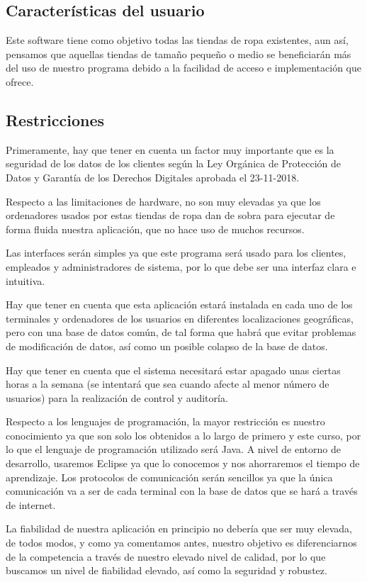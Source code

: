 \subsection{Características del usuario}
Este software tiene como objetivo todas las tiendas de ropa existentes, aun así, pensamos
que aquellas tiendas de tamaño pequeño o medio se beneficiarán más del uso de
nuestro programa debido a la facilidad de acceso e implementación que ofrece.
\subsection{Restricciones}
Primeramente, hay que tener en cuenta un factor muy importante que es la seguridad
de los datos de los clientes según la Ley Orgánica de Protección de Datos y Garantía de
los Derechos Digitales aprobada el 23-11-2018.

Respecto a las limitaciones de hardware, no son muy elevadas ya que los ordenadores
usados por estas tiendas de ropa dan de sobra para ejecutar de forma fluida nuestra
aplicación, que no hace uso de muchos recursos.

Las interfaces serán simples ya que este programa será usado para los clientes, empleados y
administradores de sistema, por lo que debe ser una interfaz clara e intuitiva.

Hay que tener en cuenta que esta aplicación estará instalada en cada uno de los
terminales y ordenadores de los usuarios en diferentes localizaciones geográficas, pero
con una base de datos común, de tal forma que habrá que evitar problemas de
modificación de datos, así como un posible colapso de la base de datos.

Hay que tener en cuenta que el sistema necesitará estar apagado unas ciertas horas a
la semana (se intentará que sea cuando afecte al menor número de usuarios) para la
realización de control y auditoría.

Respecto a los lenguajes de programación, la mayor restricción es nuestro
conocimiento ya que son solo los obtenidos a lo largo de primero y este curso, por lo
que el lenguaje de programación utilizado será Java. A nivel de entorno de desarrollo,
usaremos Eclipse ya que lo conocemos y nos ahorraremos el tiempo de aprendizaje.
Los protocolos de comunicación serán sencillos ya que la única comunicación va a ser
de cada terminal con la base de datos que se hará a través de internet.

La fiabilidad de nuestra aplicación en principio no debería que ser muy elevada, de
todos modos, y como ya comentamos antes, nuestro objetivo es diferenciarnos de la
competencia a través de nuestro elevado nivel de calidad, por lo que buscamos un
nivel de fiabilidad elevado, así como la seguridad y robustez.

